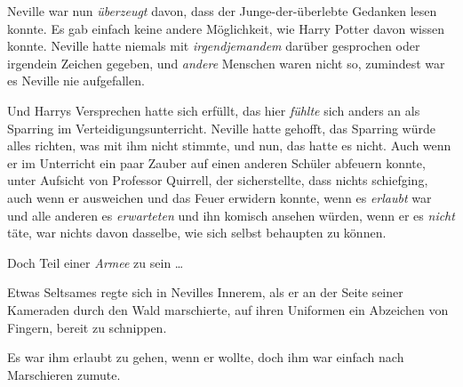 Neville war nun \emph{überzeugt} davon, dass der Junge-der-überlebte Gedanken lesen konnte. Es gab einfach keine andere Möglichkeit, wie Harry Potter davon wissen konnte. Neville hatte niemals mit \emph{irgendjemandem} darüber gesprochen oder irgendein Zeichen gegeben, und \emph{andere} Menschen waren nicht so, zumindest war es Neville nie aufgefallen.

Und Harrys Versprechen hatte sich erfüllt, das hier \emph{fühlte} sich anders an als Sparring im Verteidigungsunterricht. Neville hatte gehofft, das Sparring würde alles richten, was mit ihm nicht stimmte, und nun, das hatte es nicht. Auch wenn er im Unterricht ein paar Zauber auf einen anderen Schüler abfeuern konnte, unter Aufsicht von Professor Quirrell, der sicherstellte, dass nichts schiefging, auch wenn er ausweichen und das Feuer erwidern konnte, wenn es \emph{erlaubt} war und alle anderen es \emph{erwarteten} und ihn komisch ansehen würden, wenn er es \emph{nicht} täte, war nichts davon dasselbe, wie sich selbst behaupten zu können.

Doch Teil einer \emph{Armee} zu sein …

Etwas Seltsames regte sich in Nevilles Innerem, als er an der Seite seiner Kameraden durch den Wald marschierte, auf ihren Uniformen ein Abzeichen von Fingern, bereit zu schnippen.

Es war ihm erlaubt zu gehen, wenn er wollte, doch ihm war einfach nach Marschieren zumute.

